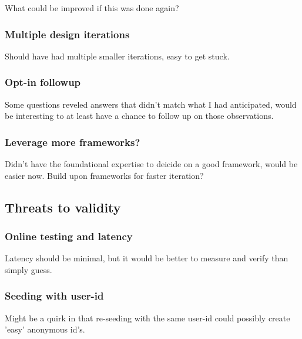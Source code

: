 \documentclass[nofilelist,dvipsnames]{cslthse-msc}
\begin{document}
        What could be improved if this was done again?

        \subsubsection{Multiple design iterations}

          Should have had multiple smaller iterations, easy to get stuck.

        \subsubsection{Opt-in followup}

          Some questions reveled answers that didn't match what I had
          anticipated, would be interesting to at least have a chance to follow
          up on those observations.

        \subsubsection{Leverage more frameworks?}

          Didn't have the foundational expertise to deicide on a good
          framework, would be easier now.
          Build upon frameworks for faster iteration?

			\subsection{Threats to validity}

        \subsubsection{Online testing and latency}

          Latency should be minimal, but it would be better to measure and
          verify than simply guess.

        \subsubsection{Seeding with user-id}

          Might be a quirk in that re-seeding with the same user-id could
          possibly create 'easy' anonymous id's.



\end{document}
